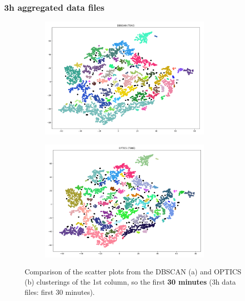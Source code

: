 \subsubsection{3h aggregated data files}

\begin{figure}[H]
	\centering
	\begin{subfigure}{.5\textwidth}
    \centering
    \includegraphics[width=0.9\textwidth]{./images/clusteringResults/3h-1-DBSCAN.png}
  \end{subfigure}%
  \begin{subfigure}{.5\textwidth}
    \centering
    \includegraphics[width=0.9\textwidth]{./images/clusteringResults/3h-1-OPTICS.png}
	\end{subfigure}
	\caption{Comparison of the scatter plots from the DBSCAN (a) and OPTICS (b) clusterings of the 1st column, so the first \textbf{30 minutes} (3h data files: first 30 minutes).}
  \label{figure:finalClustering3h-1}
\end{figure}



